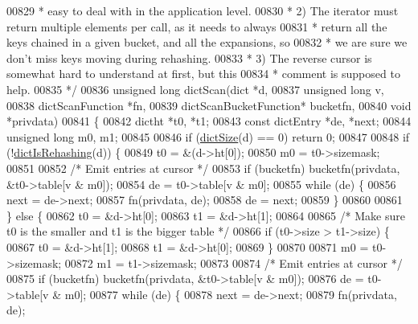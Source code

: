 \begin{DoxyCode}
00829 \textcolor{comment}{ *    easy to deal with in the application level.}
00830 \textcolor{comment}{ * 2) The iterator must return multiple elements per call, as it needs to always}
00831 \textcolor{comment}{ *    return all the keys chained in a given bucket, and all the expansions, so}
00832 \textcolor{comment}{ *    we are sure we don't miss keys moving during rehashing.}
00833 \textcolor{comment}{ * 3) The reverse cursor is somewhat hard to understand at first, but this}
00834 \textcolor{comment}{ *    comment is supposed to help.}
00835 \textcolor{comment}{ */}
00836 \textcolor{keywordtype}{unsigned} \textcolor{keywordtype}{long} dictScan(dict *d,
00837                        \textcolor{keywordtype}{unsigned} \textcolor{keywordtype}{long} v,
00838                        dictScanFunction *fn,
00839                        dictScanBucketFunction* bucketfn,
00840                        \textcolor{keywordtype}{void} *privdata)
00841 \{
00842     dictht *t0, *t1;
00843     \textcolor{keyword}{const} dictEntry *de, *next;
00844     \textcolor{keywordtype}{unsigned} \textcolor{keywordtype}{long} m0, m1;
00845 
00846     \textcolor{keywordflow}{if} (\hyperlink{dict_8h_af193430dd3d5579a52b194512f72c1f0}{dictSize}(d) == 0) \textcolor{keywordflow}{return} 0;
00847 
00848     \textcolor{keywordflow}{if} (!\hyperlink{dict_8h_aa6e4917a6a32fdf47180e03ed8969e02}{dictIsRehashing}(d)) \{
00849         t0 = &(d->ht[0]);
00850         m0 = t0->sizemask;
00851 
00852         \textcolor{comment}{/* Emit entries at cursor */}
00853         \textcolor{keywordflow}{if} (bucketfn) bucketfn(privdata, &t0->table[v & m0]);
00854         de = t0->table[v & m0];
00855         \textcolor{keywordflow}{while} (de) \{
00856             next = de->next;
00857             fn(privdata, de);
00858             de = next;
00859         \}
00860 
00861     \} \textcolor{keywordflow}{else} \{
00862         t0 = &d->ht[0];
00863         t1 = &d->ht[1];
00864 
00865         \textcolor{comment}{/* Make sure t0 is the smaller and t1 is the bigger table */}
00866         \textcolor{keywordflow}{if} (t0->size > t1->size) \{
00867             t0 = &d->ht[1];
00868             t1 = &d->ht[0];
00869         \}
00870 
00871         m0 = t0->sizemask;
00872         m1 = t1->sizemask;
00873 
00874         \textcolor{comment}{/* Emit entries at cursor */}
00875         \textcolor{keywordflow}{if} (bucketfn) bucketfn(privdata, &t0->table[v & m0]);
00876         de = t0->table[v & m0];
00877         \textcolor{keywordflow}{while} (de) \{
00878             next = de->next;
00879             fn(privdata, de);

\end{DoxyCode}
